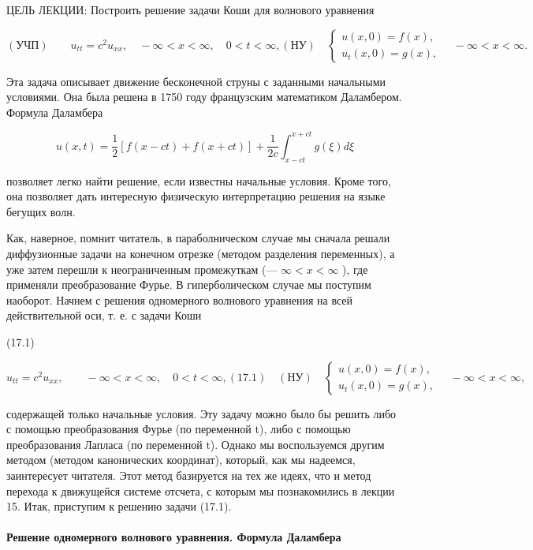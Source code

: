 \documentclass[
  ukrainian,
]{article}
\begin{document}
ЦЕЛЬ ЛЕКЦИИ: Построить решение задачи Коши для волнового уравнения

\[
(\text{УЧП}) \qquad u_{tt} = c^2 u_{xx}, \quad -\infty < x < \infty, \quad 0 < t < \infty,
(\text{НУ}) \quad \begin{cases} u(x, 0) = f(x), \\ u_t(x, 0) = g(x), \end{cases} \quad -\infty < x < \infty.
\]

Эта задача описывает движение бесконечной струны с заданными начальными
условиями. Она была решена в 1750 году французским математиком
Даламбером. Формула Даламбера

\[
u(x, t) = \frac{1}{2} [f(x - ct) + f(x + ct)] + \frac{1}{2c} \int_{x-ct}^{x+ct} g(\xi) d\xi
\]

позволяет легко найти решение, если известны начальные условия. Кроме
того, она позволяет дать интересную физическую интерпретацию решения на
языке бегущих волн.

Как, наверное, помнит читатель, в параболническом случае мы сначала
решали диффузионные задачи на конечном отрезке (методом разделения
переменных), а уже затем перешли к неограниченным промежуткам (---
\(\infty < x < \infty\) ), где применяли преобразование Фурье. В
гиперболическом случае мы поступим наоборот. Начнем с решения
одномерного волнового уравнения на всей действительной оси, т. е. с
задачи Коши

(17.1)

\[
u_{tt} = c^{2}u_{xx}, \qquad -\infty < x < \infty, \quad 0 < t < \infty,
(17.1) \quad (\text{НУ}) \quad \begin{cases} u(x, 0) = f(x), \\ u_{t}(x, 0) = g(x), \end{cases} \quad -\infty < x < \infty,
\]

содержащей только начальные условия. Эту задачу можно было бы решить
либо с помощью преобразования Фурье (по переменной t), либо с помощью
преобразования Лапласа (по переменной t). Однако мы воспользуемся другим
методом (методом канонических координат), который, как мы надеемся,
заинтересует читателя. Этот метод базируется на тех же идеях, что и
метод перехода к движущейся системе отсчета, с которым мы познакомились
в лекции 15. Итак, приступим к решению задачи (17.1).

\paragraph{Решение одномерного волнового уравнения. Формула
Даламбера}\label{ux440ux435ux448ux435ux43dux438ux435-ux43eux434ux43dux43eux43cux435ux440ux43dux43eux433ux43e-ux432ux43eux43bux43dux43eux432ux43eux433ux43e-ux443ux440ux430ux432ux43dux435ux43dux438ux44f.-ux444ux43eux440ux43cux443ux43bux430-ux434ux430ux43bux430ux43cux431ux435ux440ux430}
\end{document}
